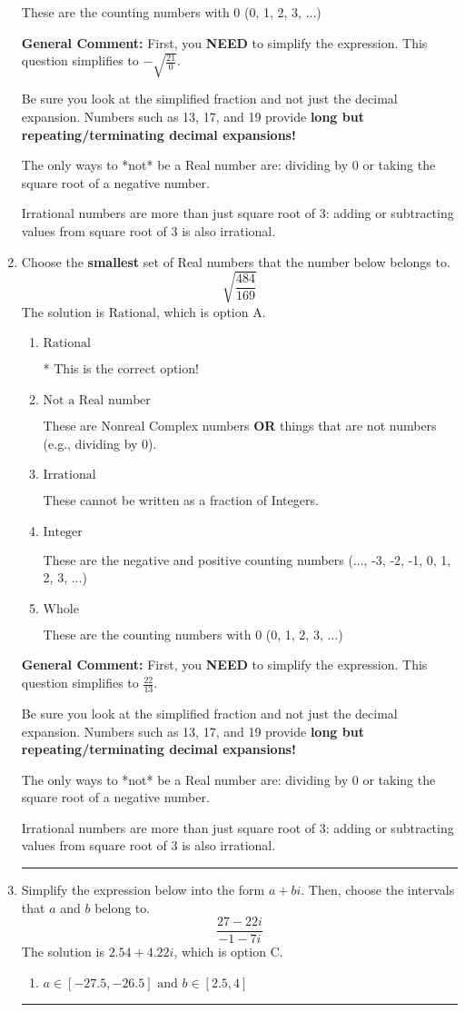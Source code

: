 \documentclass{extbook}[14pt]
\newcommand{\litem}[1]{\item #1

\rule{\textwidth}{0.4pt}}
\begin{document}
\begin{enumerate}
{\begin{enumerate}[label=\Alph*.]
These are the counting numbers with 0 (0, 1, 2, 3, ...)
\end{enumerate}

\textbf{General Comment:} First, you \textbf{NEED} to simplify the expression. This question simplifies to $-\sqrt{\frac{21}{0}}$. 
 
 Be sure you look at the simplified fraction and not just the decimal expansion. Numbers such as 13, 17, and 19 provide \textbf{long but repeating/terminating decimal expansions!} 
 
 The only ways to *not* be a Real number are: dividing by 0 or taking the square root of a negative number. 
 
 Irrational numbers are more than just square root of 3: adding or subtracting values from square root of 3 is also irrational.
}
\litem{
Choose the \textbf{smallest} set of Real numbers that the number below belongs to.
\[ \sqrt{\frac{484}{169}} \]The solution is \( \text{Rational} \), which is option A.\begin{enumerate}[label=\Alph*.]
\item \( \text{Rational} \)

* This is the correct option!
\item \( \text{Not a Real number} \)

These are Nonreal Complex numbers \textbf{OR} things that are not numbers (e.g., dividing by 0).
\item \( \text{Irrational} \)

These cannot be written as a fraction of Integers.
\item \( \text{Integer} \)

These are the negative and positive counting numbers (..., -3, -2, -1, 0, 1, 2, 3, ...)
\item \( \text{Whole} \)

These are the counting numbers with 0 (0, 1, 2, 3, ...)
\end{enumerate}

\textbf{General Comment:} First, you \textbf{NEED} to simplify the expression. This question simplifies to $\frac{22}{13}$. 
 
 Be sure you look at the simplified fraction and not just the decimal expansion. Numbers such as 13, 17, and 19 provide \textbf{long but repeating/terminating decimal expansions!} 
 
 The only ways to *not* be a Real number are: dividing by 0 or taking the square root of a negative number. 
 
 Irrational numbers are more than just square root of 3: adding or subtracting values from square root of 3 is also irrational.
}
\litem{
Simplify the expression below into the form $a+bi$. Then, choose the intervals that $a$ and $b$ belong to.
\[ \frac{27 - 22 i}{-1 - 7 i} \]The solution is \( 2.54  + 4.22 i \), which is option C.\begin{enumerate}[label=\Alph*.]
\item \( a \in [-27.5, -26.5] \text{ and } b \in [2.5, 4] \)


\end{enumerate}}
\end{enumerate}
\end{document}
